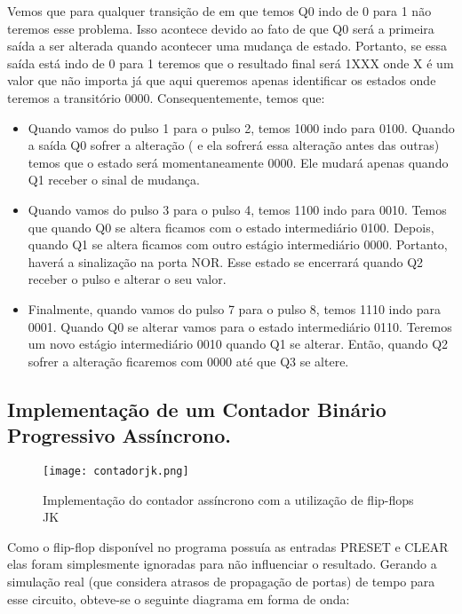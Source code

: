 \documentclass[12pt]{article}
\begin{document}
	Vemos que para qualquer transição de em que temos Q0 indo de 0 para 1 não teremos esse problema. Isso acontece devido ao fato de que Q0 será a primeira saída a ser alterada quando acontecer uma mudança de estado. Portanto, se essa saída está indo de 0 para 1 teremos que o resultado final será 1XXX onde X é um valor que não importa já que aqui queremos apenas identificar os estados onde teremos a transitório 0000.
	Consequentemente, temos que:
	
	\begin{itemize}
		\item Quando vamos do pulso 1 para o pulso 2,  temos 1000 indo para 0100. Quando a saída  Q0 sofrer a alteração ( e ela sofrerá essa alteração antes das outras) temos que o estado será momentaneamente 0000. Ele mudará apenas quando Q1 receber o sinal de mudança.
		\item Quando vamos do pulso 3 para o pulso 4, temos 1100 indo para 0010. Temos que quando Q0 se altera ficamos com o estado intermediário 0100. Depois, quando Q1 se altera ficamos com outro estágio intermediário 0000. Portanto, haverá a sinalização na porta NOR. Esse estado se encerrará quando Q2 receber o pulso e alterar o seu valor.
		\item Finalmente, quando vamos do pulso 7 para o pulso 8, temos 1110 indo para 0001. Quando Q0 se alterar vamos para o estado intermediário 0110. Teremos um novo estágio intermediário 0010 quando Q1 se alterar. Então, quando Q2 sofrer a alteração ficaremos com 0000 até que Q3 se altere. 
	\end{itemize}

	
	\subsection{Implementação de um Contador Binário Progressivo Assíncrono.}
	
	\begin{figure}[H]
		\centering
		\texttt{[image: contadorjk.png]}
		\caption{Implementação do contador assíncrono com a utilização de flip-flops JK}
		\label{fig:contadorjk}
	\end{figure}
	
	Como o flip-flop disponível no programa possuía as entradas PRESET e CLEAR elas foram simplesmente ignoradas para não influenciar o resultado. Gerando a simulação real (que considera atrasos de propagação de portas) de tempo para esse circuito, obteve-se o seguinte diagrama em forma de onda:
	
\end{document}
